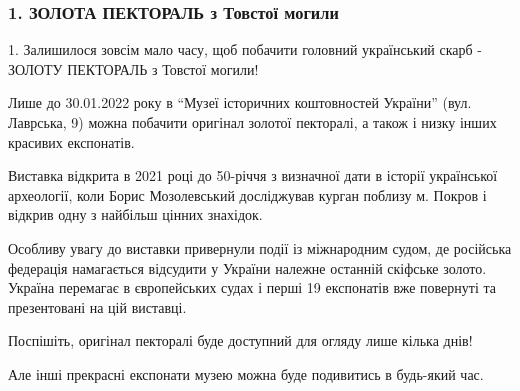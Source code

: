  
 
 
 
 
\clearpage
\subsubsection{1. ЗОЛОТА ПЕКТОРАЛЬ з Товстої могили}
\label{sec:28_01_2022.fb.fb_group.story_kiev_ua.1.kiev_visim_sekretiv.1.pektoral}


1. Залишилося зовсім мало часу, щоб побачити головний український скарб -
ЗОЛОТУ ПЕКТОРАЛЬ з Товстої могили!

Лише до 30.01.2022 року в \enquote{Музеї історичних коштовностей України}
(вул. Лаврська, 9) можна побачити оригінал золотої пекторалі, а також і низку
інших красивих експонатів. 

Виставка відкрита в 2021 році до 50-річчя з визначної дати в історії
української археології, коли Борис Мозолевський досліджував курган поблизу
м. Покров і відкрив одну з найбільш цінних знахідок.

Особливу увагу до виставки привернули події із міжнародним судом, де російська
федерація намагається відсудити у України належне останній скіфське золото.
Україна перемагає в європейських судах і перші 19 експонатів вже повернуті та
презентовані на цій виставці.

Поспішіть, оригінал пекторалі буде доступний для огляду лише кілька днів! 

Але інші прекрасні експонати музею можна буде подивитись в будь-який час.

